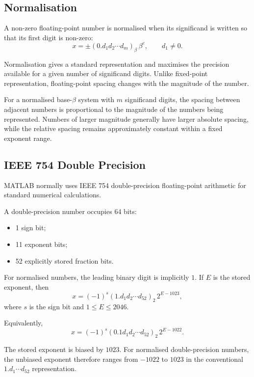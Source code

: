 \subsection{Normalisation}

\begin{definition}
  A non-zero floating-point number is normalised when its significand is written so that its first digit is non-zero:
  \[
    x=\pm(0.d_1d_2\cdots d_m)_\beta\,\beta^e,
    \qquad d_1\neq0.
  \]
\end{definition}

Normalisation gives a standard representation and maximises the precision available for a given number of significand digits. Unlike fixed-point representation, floating-point spacing changes with the magnitude of the number.

\begin{remark}
  For a normalised base-\(\beta\) system with \(m\) significand digits, the spacing between adjacent numbers is proportional to the magnitude of the numbers being represented. Numbers of larger magnitude generally have larger absolute spacing, while the relative spacing remains approximately constant within a fixed exponent range.
\end{remark}

\subsection{IEEE 754 Double Precision}

MATLAB normally uses IEEE 754 double-precision floating-point arithmetic for standard numerical calculations.

A double-precision number occupies 64 bits:
\begin{itemize}
  \item 1 sign bit;
  \item 11 exponent bits;
  \item 52 explicitly stored fraction bits.
\end{itemize}

For normalised numbers, the leading binary digit is implicitly \(1\). If \(E\) is the stored exponent, then
\[
  \boxed{
    x=(-1)^s(1.d_1d_2\cdots d_{52})_2\,2^{E-1023},
  }
\]
where \(s\) is the sign bit and \(1\leq E\leq2046\).

Equivalently,
\[
  x=(-1)^s(0.1d_1d_2\cdots d_{52})_2\,2^{E-1022}.
\]

\begin{remark}
  The stored exponent is biased by \(1023\). For normalised double-precision numbers, the unbiased exponent therefore ranges from \(-1022\) to \(1023\) in the conventional \(1.d_1\cdots d_{52}\) representation.
\end{remark}

